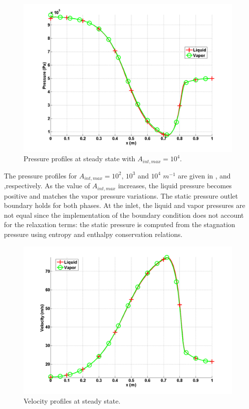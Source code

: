 %
\begin{figure}[H]
\centering
\includegraphics[width=\textwidth]{figures/SEM/Aint1e4_two_phases_pressure.png}
\caption{Pressure profiles at steady state with $A_{int,max} = 10^4$.}
\label{fig:two-fluids-rel-nozzle-press-Aint4-sem-sect4}
\end{figure}
%
The pressure profiles for $A_{int,max} = 10^2 \text{, } 10^3$ and $10^4$ $m^{-1}$ are given in ,  and  ,respectively. As the value of $A_{int,max}$ increases, the liquid pressure becomes positive and matches the vapor pressure variations. The static pressure outlet boundary holds for both phases. At the inlet, the liquid and vapor pressures are not equal since the implementation of the boundary condition does not account for the relaxation terms: the static pressure is computed from the stagnation pressure using entropy and enthalpy conservation relations.  
%
\begin{figure}[H]
\centering
\includegraphics[width=\textwidth]{figures/SEM/Aint1e4_two_phases_velocity.png}
\caption{Velocity profiles at steady state.}
\label{fig:two-fluids-rel-nozzle-vel-sem-sect4}
\end{figure}
